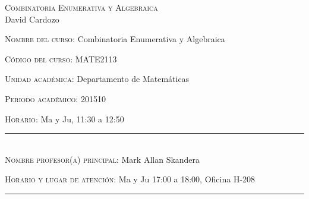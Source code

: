 \begin{center}
\textsc{\large  Combinatoria Enumerativa y Algebraica }\\[0.1cm]
\large David Cardozo\\[0.5cm]
\end{center}	

\large \noindent\textsc{Nombre del curso:}  Combinatoria Enumerativa y Algebraica %

\noindent\textsc{Código del curso:} MATE2113 %

\noindent\textsc{Unidad académica:} Departamento de Matemáticas

\noindent\textsc{Periodo acad\'emico:} 201510 %

\noindent\textsc{Horario:} Ma y Ju, 11:30 a 12:50%

\noindent\rule{\textwidth}{1pt}\\[-0.3cm]

\normalsize \noindent\textsc{Nombre profesor(a) principal:} Mark Allan Skandera %


\noindent\textsc{Horario y lugar de atenci\'on:} Ma y Ju 17:00 a
18:00, Oficina H-208

\noindent\rule{\textwidth}{1pt}\\[-0.1cm]